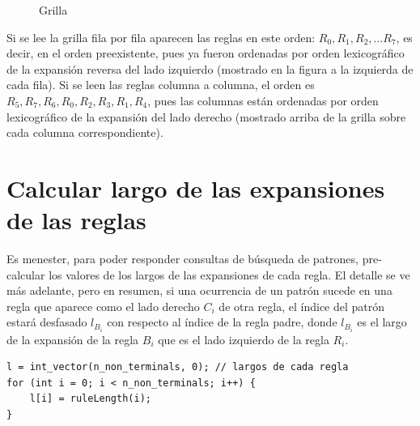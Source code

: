 \begin{figure}[h]
    
    \caption{Grilla}
    \label{fig:grid}
\end{figure}


Si se lee la grilla fila por fila aparecen las reglas en este orden: $R_0, R_1, R_2, ... R_7$, es decir, en el orden preexistente, pues ya fueron ordenadas por orden lexicográfico de la expansión reversa del lado izquierdo (mostrado en la figura a la izquierda de cada fila). Si se leen las reglas columna a columna, el orden es $R_5, R_7, R_6, R_0, R_2, R_3, R_1, R_4$, pues las columnas están ordenadas por orden lexicográfico de la expansión del lado derecho (mostrado arriba de la grilla sobre cada columna correspondiente).

\section{Calcular largo de las expansiones de las reglas}

Es menester, para poder responder consultas de búsqueda de patrones, pre-calcular los valores de los largos de las expansiones de cada regla. El detalle se ve más adelante, pero en resumen, si una ocurrencia de un patrón sucede en una regla que aparece como el lado derecho $C_i$ de otra regla, el índice del patrón estará desfasado $l_{B_i}$ con respecto al índice de la regla padre, donde $l_{B_i}$ es el largo de la expansión de la regla $B_i$ que es el lado izquierdo de la regla $R_i$. 

\begin{lstlisting}[style=cppstyle]
l = int_vector(n_non_terminals, 0); // largos de cada regla
for (int i = 0; i < n_non_terminals; i++) {
    l[i] = ruleLength(i);
}
\end{lstlisting}

